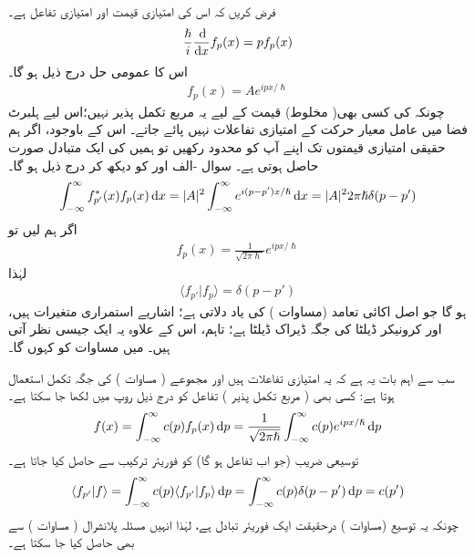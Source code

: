 فرض کریں کہ  اس کی امتیازی قیمت اور  امتیازی تفاعل ہے۔
\begin{align}
\frac{\hslash}{i} \frac{\dif}{\dif x} f_{p}(x) = pf_{p}(x)
\end{align}
اس کا عمومی حل درج ذیل ہو گا۔
\begin{align*}
f_{p}(x) = Ae^{ipx/\hslash}
\end{align*}
چونکہ  کی کسی بھی( مخلوط) قیمت کے لیے یہ مربع تکمل پذیر نہیں؛اس لیے ہلبرٹ فضا میں عامل معیار حرکت کے   امتیازی تفاعلات  نہیں پائے جاتے۔ اس کے باوجود، اگر ہم حقیقی امتیازی قیمتوں  تک اپنے آپ کو محدود رکھیں تو ہمیں     کی ایک   متبادل    صورت   حاصل ہوتی ہے۔ سوال -الف اور  کو دیکھ کر درج ذیل ہو گا۔
\begin{align}
\int_{-\infty}^{\infty} f_{p'}^{*}(x)f_{p}(x) \dif x = |A|^{2}\int_{-\infty}^{\infty}e^{i(p-p')x/\hslash} \dif x = |A|^{2}2\pi\hslash\delta(p-p')
\end{align}
اگر ہم  لیں تو 
\begin{align}\label{مساوات_قواعد_امتیازی_تفاعل_معیار_حرکت}
f_{p}(x) = \frac{1}{\sqrt{2\pi\hslash}}e^{ipx/\hslash}
\end{align}
 لہٰذا 
\begin{align}\label{مساوات_قواعد_ڈیراک_معیاری_عمودیت}
\langle f_{p'} | f_{p} \rangle = \delta(p-p')
\end{align}
ہو گا جو اصل  اکائی تعامد  (مساوات  ) کی یاد دلاتی ہے؛  اشاریے استمراری متغیرات ہیں، اور کرونیکر ڈیلٹا  کی جگہ ڈیراک ڈیلٹا  ہے؛ تاہم،  اس کے علاوہ یہ ایک جیسی نظر آتی ہیں۔ میں مساوات  کو  کہوں گا۔ 

سب سے اہم بات یہ ہے کہ یہ امتیازی تفاعلات  ہیں اور  مجموعے ( مساوات )  کی جگہ  تکمل استعمال ہوتا ہے: کسی بھی ( مربع تکمل پذیر ) تفاعل  کو درج ذیل روپ میں لکھا جا سکتا ہے۔
\begin{align}\label{مساوات_قواعد_تفاعل_بطور_فوریئر_تکمل}
f(x) = \int_{-\infty}^{\infty} c(p)f_{p}(x)\dif p = \frac{1}{\sqrt{2\pi\hslash}}\int_{-\infty}^{\infty}c(p)e^{ipx/\hslash}\dif p
\end{align}
توسیعی  ضریب  (جو اب تفاعل  ہو گا) کو فوریئر ترکیب سے حاصل کیا جاتا ہے۔
\begin{align}
\langle f_{p'} | f \rangle = \int_{-\infty}^{\infty} c(p) \langle f_{p'} | f_p \rangle \dif p = \int_{-\infty}^{\infty}c(p)\delta (p-p') \dif p = c(p')
\end{align}
چونکہ یہ توسیع (مساوات )  درحقیقت ایک فوریئر تبادل ہے،  لہٰذا انہیں مسئلہ پلانشرال ( مساوات ) سے بھی حاصل کیا جا سکتا ہے۔ 

